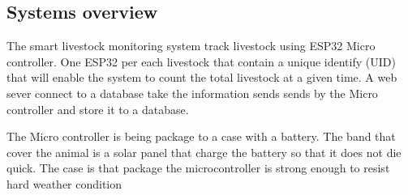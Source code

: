 \subsection{Systems overview}

The smart livestock monitoring system track livestock using ESP32 Micro controller. One ESP32 per
each livestock that contain a unique identify (UID) that will enable the system to count the total
livestock at a given time. A web sever connect to a database take the information sends sends by
the Micro controller and store it to a database.

The Micro controller is  being package to a case with a battery. The band that
cover the animal is a solar panel that charge the
battery so that it does not die quick. The case is that package the microcontroller is strong enough
to resist hard weather condition
